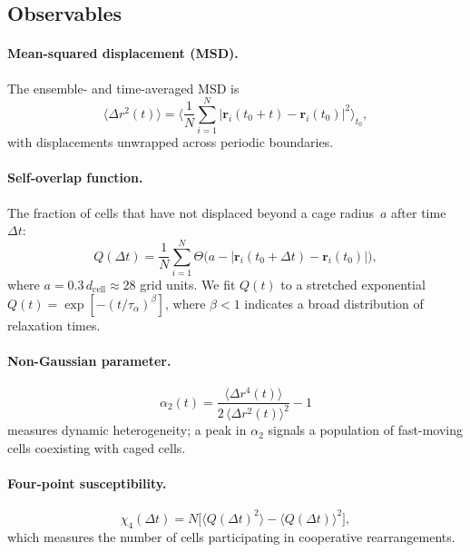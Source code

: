 \documentclass[aps,pre,twocolumn,superscriptaddress,longbibliography,floatfix]{revtex4-2}
\begin{document}
\subsection{Observables}
\label{sec:methods:obs}

\paragraph{Mean-squared displacement (MSD).}
The ensemble- and time-averaged MSD is
%
\begin{equation}
  \langle \Delta r^2(t) \rangle
    = \biggl\langle \frac{1}{N}\sum_{i=1}^{N}
      |\bm{r}_i(t_0 + t) - \bm{r}_i(t_0)|^2 \biggr\rangle_{t_0},
  \label{eq:msd}
\end{equation}
%
with displacements unwrapped across periodic boundaries.

\paragraph{Self-overlap function.}
The fraction of cells that have not displaced beyond a cage
radius~$a$ after time~$\Delta t$:
%
\begin{equation}
  Q(\Delta t) = \frac{1}{N}\sum_{i=1}^{N}
  \Theta\!\bigl(a - |\bm{r}_i(t_0 + \Delta t) - \bm{r}_i(t_0)|\bigr),
  \label{eq:Qt}
\end{equation}
%
where $a = 0.3\,d_{\mathrm{cell}} \approx 28$ grid units.  We fit
$Q(t)$ to a stretched exponential
$Q(t) = \exp[-(t/\tau_\alpha)^\beta]$, where $\beta < 1$ indicates a
broad distribution of relaxation times.

\paragraph{Non-Gaussian parameter.}
%
\begin{equation}
  \alpha_2(t)
    = \frac{\langle \Delta r^4(t)\rangle}
           {2\,\langle \Delta r^2(t)\rangle^2} - 1
  \label{eq:alpha2}
\end{equation}
%
measures dynamic heterogeneity; a peak in $\alpha_2$ signals a population
of fast-moving cells coexisting with caged cells.

\paragraph{Four-point susceptibility.}
%
\begin{equation}
  \chi_4(\Delta t) = N\bigl[\langle Q(\Delta t)^2 \rangle
  - \langle Q(\Delta t)\rangle^2\bigr],
  \label{eq:chi4}
\end{equation}
%
which measures the number of cells participating in cooperative
rearrangements.
\end{document}
